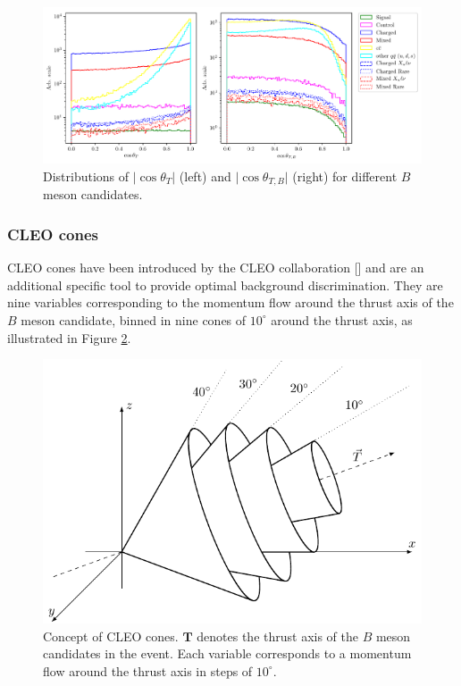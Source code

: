 \documentclass[oneside,a4paper,openany,12pt]{scrbook}
\begin{document}
\begin{figure}[H]
\centering
\captionsetup{width=0.8\linewidth}
\includegraphics[width=\linewidth]{fig/cs_cosplots}
\caption{Distributions of $\vert \cos\theta_T\vert$ (left) and $\vert \cos\theta_{T,B}\vert$ (right) for different $B$ meson candidates.}
\label{fig:cosplots}
\end{figure}

\subsubsection{CLEO cones}
CLEO cones have been introduced by the CLEO collaboration [] and are an additional specific tool to provide optimal background discrimination. They are nine variables corresponding to the momentum flow around the thrust axis of the $B$ meson candidate, binned in nine cones of $10^\circ$ around the thrust axis, as illustrated in Figure \ref{fig:ccones}. 

\begin{figure}[H]
\centering
\captionsetup{width=0.8\linewidth}
\includegraphics[scale=1]{texfig/CCones}
\caption{Concept of CLEO cones. $\mathbf{T}$ denotes the thrust axis of the $B$ meson candidates in the event. Each variable corresponds to a momentum flow around the thrust axis in steps of $10^\circ$.}
\label{fig:ccones}
\end{figure}
\end{document}
